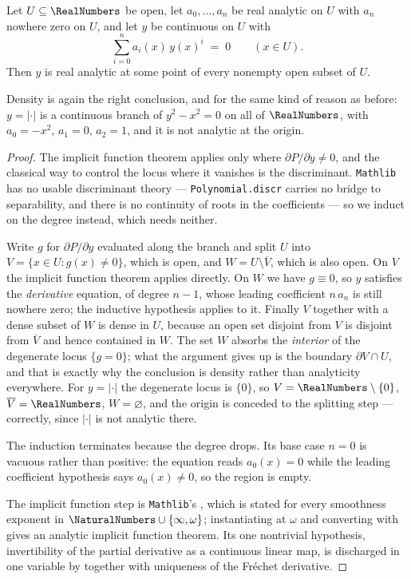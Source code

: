 \begin{theorem}\label{ne:thm:algebraic}
Let $U\subseteq\RealNumbers$ be open, let $a_0,\dots,a_n$ be real analytic on $U$ with
$a_n$ nowhere zero on $U$, and let $y$ be continuous on $U$ with
\[
  \sum_{i=0}^{n} a_i(x)\,y(x)^i \;=\; 0 \qquad (x\in U).
\]
Then $y$ is real analytic at some point of every nonempty open subset of $U$.
\end{theorem}

Density is again the right conclusion, and for the same kind of reason as
before: $y=|\cdot|$ is a continuous branch of $y^2-x^2=0$ on all of $\RealNumbers$, with
$a_0=-x^2$, $a_1=0$, $a_2=1$, and it is not analytic at the origin.

\begin{proof}
The implicit function theorem applies only where $\partial P/\partial y\ne 0$,
and the classical way to control the locus where it vanishes is the
discriminant.  \texttt{Mathlib} has no usable discriminant theory ---
\texttt{Polynomial.discr} carries no bridge to separability, and there is no
continuity of roots in the coefficients --- so we induct on the degree
instead, which needs neither.

Write $g$ for $\partial P/\partial y$ evaluated along the branch and split
$U$ into $V=\{x\in U: g(x)\ne0\}$, which is open, and
$W=U\setminus\overline V$, which is also open.  On $V$ the implicit function
theorem applies directly.  On $W$ we have $g\equiv 0$, so $y$ satisfies the
\emph{derivative} equation, of degree $n-1$, whose leading coefficient
$n\,a_n$ is still nowhere zero; the inductive hypothesis applies to it.
Finally $V$ together with a dense subset of $W$ is dense in $U$, because an
open set disjoint from $V$ is disjoint from $\overline V$ and hence contained
in $W$.  The set $W$ absorbs the \emph{interior} of the degenerate locus
$\{g=0\}$; what the argument gives up is the boundary $\partial V\cap U$, and
that is exactly why the conclusion is density rather than analyticity
everywhere.  For $y=|\cdot|$ the degenerate locus is $\{0\}$, so $V=\RealNumbers
\setminus\{0\}$, $\overline V=\RealNumbers$, $W=\varnothing$, and the origin is conceded
to the splitting step --- correctly, since $|\cdot|$ is not analytic there.

The induction terminates because the degree drops.  Its base case $n=0$ is
vacuous rather than positive: the equation reads $a_0(x)=0$ while the leading
coefficient hypothesis says $a_0(x)\ne0$, so the region is empty.

The implicit function step is \texttt{Mathlib}'s
, which is stated for every smoothness
exponent in $\NaturalNumbers\cup\{\infty,\omega\}$; instantiating at $\omega$ and converting
with  gives an analytic implicit function
theorem.  Its one nontrivial hypothesis, invertibility of the partial
derivative as a continuous linear map, is discharged in one variable by
 together with uniqueness of the
Fréchet derivative.
\end{proof}

